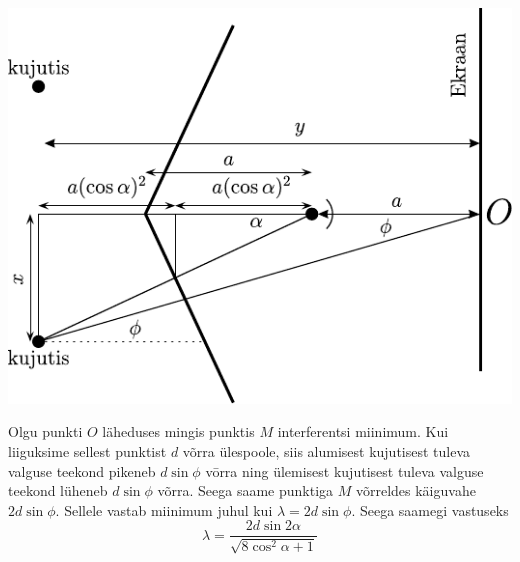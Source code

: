 \begin{center}
	\includegraphics[width=0.8\linewidth]{2004-v3g-09-lah.pdf}
\end{center}

Olgu punkti $O$ läheduses mingis punktis $M$ interferentsi miinimum. Kui liiguksime sellest punktist $d$ võrra ülespoole, siis alumisest kujutisest tuleva valguse teekond pikeneb $d \sin \phi$ vōrra ning ülemisest kujutisest tuleva valguse teekond lüheneb $d \sin \phi$ võrra. Seega saame punktiga $M$ võrreldes käiguvahe $2 d \sin \phi$. Sellele vastab miinimum juhul kui $\lambda=2 d \sin \phi$. Seega saamegi vastuseks
\[
\lambda=\frac{2 d \sin 2 \alpha}{\sqrt{8 \cos ^{2} \alpha+1}}
\]
\probend